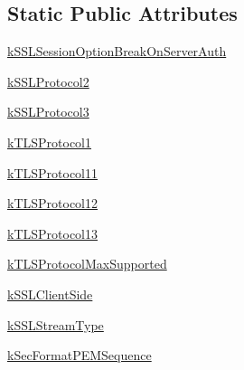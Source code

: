 \subsection*{Static Public Attributes}
\begin{DoxyCompactItemize}
\item 
\hyperlink{classpip_1_1__vendor_1_1urllib3_1_1contrib_1_1__securetransport_1_1bindings_1_1SecurityConst_a8a891444fcbaab6c819d7913f5aaafb9}{k\+S\+S\+L\+Session\+Option\+Break\+On\+Server\+Auth}
\item 
\hyperlink{classpip_1_1__vendor_1_1urllib3_1_1contrib_1_1__securetransport_1_1bindings_1_1SecurityConst_a4446aa28008f43d57246bfc71d0010a6}{k\+S\+S\+L\+Protocol2}
\item 
\hyperlink{classpip_1_1__vendor_1_1urllib3_1_1contrib_1_1__securetransport_1_1bindings_1_1SecurityConst_a8f3b50f95cbc255db0b74bfe27f37be1}{k\+S\+S\+L\+Protocol3}
\item 
\hyperlink{classpip_1_1__vendor_1_1urllib3_1_1contrib_1_1__securetransport_1_1bindings_1_1SecurityConst_ab17ca27cd2ef484437e78485a436810c}{k\+T\+L\+S\+Protocol1}
\item 
\hyperlink{classpip_1_1__vendor_1_1urllib3_1_1contrib_1_1__securetransport_1_1bindings_1_1SecurityConst_a66e13ec05d7f01e645aae332158bc3c5}{k\+T\+L\+S\+Protocol11}
\item 
\hyperlink{classpip_1_1__vendor_1_1urllib3_1_1contrib_1_1__securetransport_1_1bindings_1_1SecurityConst_ad863e1faac4238730e95c1489441dd32}{k\+T\+L\+S\+Protocol12}
\item 
\hyperlink{classpip_1_1__vendor_1_1urllib3_1_1contrib_1_1__securetransport_1_1bindings_1_1SecurityConst_af8d16deac4f26f20e8aa815c22be7971}{k\+T\+L\+S\+Protocol13}
\item 
\hyperlink{classpip_1_1__vendor_1_1urllib3_1_1contrib_1_1__securetransport_1_1bindings_1_1SecurityConst_ac56a640061812c10bd59c28980109714}{k\+T\+L\+S\+Protocol\+Max\+Supported}
\item 
\hyperlink{classpip_1_1__vendor_1_1urllib3_1_1contrib_1_1__securetransport_1_1bindings_1_1SecurityConst_a0834eae0d4517b932440d9f8c23b2013}{k\+S\+S\+L\+Client\+Side}
\item 
\hyperlink{classpip_1_1__vendor_1_1urllib3_1_1contrib_1_1__securetransport_1_1bindings_1_1SecurityConst_a904ebdf8e8cc1bcc42f5de06432e96fd}{k\+S\+S\+L\+Stream\+Type}
\item 
\hyperlink{classpip_1_1__vendor_1_1urllib3_1_1contrib_1_1__securetransport_1_1bindings_1_1SecurityConst_aad787364cf7c5a5d2b6dffd341ab97e1}{k\+Sec\+Format\+P\+E\+M\+Sequence}

\end{DoxyCompactItemize}

